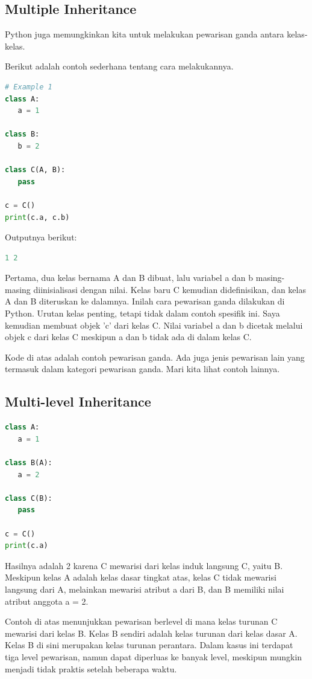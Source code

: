 \documentclass{article}
\begin{document}
\subsection{Multiple Inheritance}
Python juga memungkinkan kita untuk melakukan pewarisan ganda antara kelas-kelas.

Berikut adalah contoh sederhana tentang cara melakukannya.
\begin{lstlisting}[language=Python, caption={}, captionpos=b]
# Example 1
class A:
   a = 1
   
class B:
   b = 2
   
class C(A, B):
   pass

c = C()
print(c.a, c.b)
\end{lstlisting}
Outputnya berikut:
\begin{lstlisting}[language=Python, caption={}, captionpos=b]
1 2
\end{lstlisting}
Pertama, dua kelas bernama A dan B dibuat, lalu variabel a dan b masing-masing diinisialisasi dengan nilai. Kelas baru C kemudian didefinisikan, dan kelas A dan B diteruskan ke dalamnya. Inilah cara pewarisan ganda dilakukan di Python. Urutan kelas penting, tetapi tidak dalam contoh spesifik ini. Saya kemudian membuat objek 'c' dari kelas C. Nilai variabel a dan b dicetak melalui objek c dari kelas C meskipun a dan b tidak ada di dalam kelas C.

Kode di atas adalah contoh pewarisan ganda. Ada juga jenis pewarisan lain yang termasuk dalam kategori pewarisan ganda. Mari kita lihat contoh lainnya.

\subsection{Multi-level Inheritance}
\begin{lstlisting}[language=Python, caption={}, captionpos=b]
class A:
   a = 1

class B(A):
   a = 2

class C(B):
   pass

c = C()
print(c.a)
\end{lstlisting}

Hasilnya adalah 2 karena C mewarisi dari kelas induk langsung C, yaitu B. Meskipun kelas A adalah kelas dasar tingkat atas, kelas C tidak mewarisi langsung dari A, melainkan mewarisi atribut a dari B, dan B memiliki nilai atribut anggota a = 2.

Contoh di atas menunjukkan pewarisan berlevel di mana kelas turunan C mewarisi dari kelas B. Kelas B sendiri adalah kelas turunan dari kelas dasar A. Kelas B di sini merupakan kelas turunan perantara. Dalam kasus ini terdapat tiga level pewarisan, namun dapat diperluas ke banyak level, meskipun mungkin menjadi tidak praktis setelah beberapa waktu.
\end{document}
